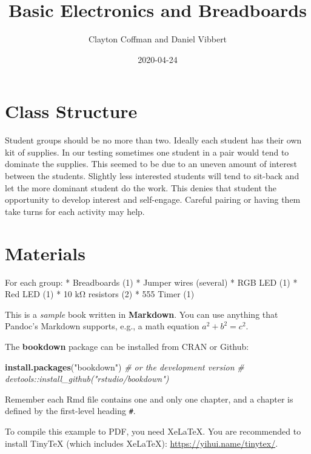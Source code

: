 \documentclass[
]{book}
\title{Basic Electronics and Breadboards}
\author{Clayton Coffman and Daniel Vibbert}
\date{2020-04-24}
\newenvironment{Shaded}{\begin{snugshade}}{\end{snugshade}}
\newcommand{\CommentTok}[1]{\textcolor[rgb]{0.56,0.35,0.01}{\textit{#1}}}
\newcommand{\KeywordTok}[1]{\textcolor[rgb]{0.13,0.29,0.53}{\textbf{#1}}}
\newcommand{\NormalTok}[1]{#1}
\newcommand{\StringTok}[1]{\textcolor[rgb]{0.31,0.60,0.02}{#1}}
\begin{document}
\maketitle

{
\setcounter{tocdepth}{1}
\tableofcontents
}
\hypertarget{class-structure}{%
\chapter{Class Structure}\label{class-structure}}

Student groups should be no more than two. Ideally each student has their own kit of supplies. In our testing sometimes one student in a pair would tend to dominate the supplies. This seemed to be due to an uneven amount of interest between the students. Slightly less interested students will tend to sit-back and let the more dominant student do the work. This denies that student the opportunity to develop interest and self-engage. Careful pairing or having them take turns for each activity may help.

\hypertarget{materials}{%
\chapter{Materials}\label{materials}}

For each group:
* Breadboards (1)
* Jumper wires (several)
* RGB LED (1)
* Red LED (1)
* 10 kΩ resistors (2)
* 555 Timer (1)

This is a \emph{sample} book written in \textbf{Markdown}. You can use anything that Pandoc's Markdown supports, e.g., a math equation \(a^2 + b^2 = c^2\).

The \textbf{bookdown} package can be installed from CRAN or Github:

\begin{Shaded}
\begin{Highlighting}[]
\KeywordTok{install.packages}\NormalTok{(}\StringTok{"bookdown"}\NormalTok{)}
\CommentTok{# or the development version}
\CommentTok{# devtools::install_github("rstudio/bookdown")}
\end{Highlighting}
\end{Shaded}

Remember each Rmd file contains one and only one chapter, and a chapter is defined by the first-level heading \texttt{\#}.

To compile this example to PDF, you need XeLaTeX. You are recommended to install TinyTeX (which includes XeLaTeX): \url{https://yihui.name/tinytex/}.
\end{document}

